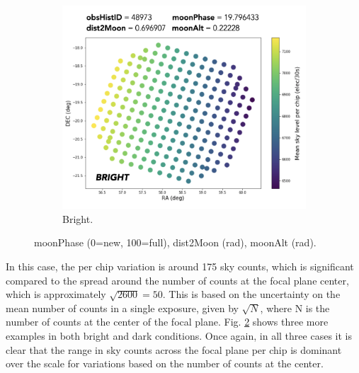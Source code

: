 \begin{figure}
\begin{subfigure}[b]{.32\textwidth}
  \centering
  \includegraphics[width=\textwidth]{images/sensors/skymodel_bright2.jpg}
  \caption{Bright.}
  \label{fig:sub2}
\end{subfigure}
\caption{moonPhase (0=new, 100=full), dist2Moon (rad), moonAlt (rad).}
\label{fig:skymodel2}
\end{figure}

In this case, the per chip variation is around 175 sky counts, which is significant compared to the spread around the number of counts at the focal plane center, which is approximately $\sqrt{2600} = 50$. This is based on the uncertainty on the mean number of counts in a single exposure, given by $\sqrt{N}$, where N is the number of counts at the center of the focal plane. Fig. \ref{fig:skymodel2} shows three more examples in both bright and dark conditions. Once again, in all three cases it is clear that the range in sky counts across the focal plane per chip is dominant over the scale for variations based on the number of counts at the center.

